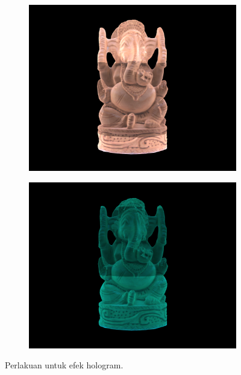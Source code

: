 \documentclass[conference]{IEEEtran}
\begin{document}
\begin{figure} [h]
\begin{center}
\begin{subfigure}[t]{0.11\textwidth}
					\caption{\label{fig:ilusi2}}
				\end{subfigure}
				\hspace{0.05em}
				\begin{subfigure}[t]{0.11\textwidth}
					\includegraphics[width=\textwidth]{img/ilusi3.png}
					\caption{\label{fig:ilusi3}}
				\end{subfigure}
				\hspace{0.05em}
				\begin{subfigure}[t]{0.11\textwidth}
					\includegraphics[width=\textwidth]{img/ilusi4.png}
					\caption{\label{fig:ilusi4}}
				\end{subfigure}
			\end{center}
			\vspace{-1ex}
			\caption{Perlakuan untuk efek hologram.}
			\label{fig:sb_p1}
		\end{figure}
		\vspace{-2ex}
	
\end{document}
